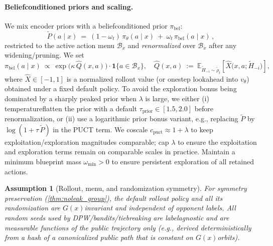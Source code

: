\documentclass[10pt]{article}
\newcommand{\E}{\mathbb{E}}
\newcommand{\1}{\mathbf{1}}
\theoremstyle{plain}
\newtheorem{assumption}{Assumption}
\begin{document}
\paragraph{Belief\textendash conditioned priors and scaling.}
We mix encoder priors with a belief\textendash conditioned prior $\pi_{\text{bel}}$:
\[
\tilde P(a\mid x)\ =\ (1-\omega_t)\,\pi_\theta(a\mid x)\ +\ \omega_t\,\pi_{\text{bel}}(a\mid x)\,,
\]
restricted to the active action menu $\mathcal{B}_x$ and \emph{renormalized} over $\mathcal{B}_x$ after any widening/pruning. We set
\[
\pi_{\text{bel}}(a\mid x)\ \propto\ \exp\!\big(\kappa\,\widehat Q(x,a)\big)\cdot \1\{a\in\mathcal{B}_x\},\quad
\widehat Q(x,a)\ :=\ \E_{\tilde H_{-i}\sim \tilde\rho_t}\!\left[\hat X\big(x,a;\tilde H_{-i}\big)\right],
\]
where $\hat X\in[-1,1]$ is a normalized rollout value (or one\textendash step lookahead into $v_\theta$) obtained under a fixed default policy. To avoid the exploration bonus being dominated by a sharply peaked prior when $\lambda$ is large, we either (i) temperature\textendash flatten the prior with a default $\tau_{\text{prior}}\in[1.5,2.0]$ before renormalization, or (ii) use a logarithmic prior bonus variant, e.g., replacing $\tilde P$ by $\log(1+\tau\,\tilde P)$ in the PUCT term. We co\textendash scale $c_{\text{puct}}\approx 1+\lambda$ to keep exploitation/exploration magnitudes comparable; cap $\lambda$ to ensure the exploitation and exploration terms remain on comparable scales in practice. Maintain a minimum blueprint mass $\omega_{\min}>0$ to ensure persistent exploration of all retained actions.

\begin{assumption}[Rollout, menu, and randomization symmetry]
\label{ass:rollout_sym}
For symmetry preservation (\cref{thm:noleak_group}), the default rollout policy and all its randomization are $G(x)$\textendash invariant and independent of opponent labels. All random seeds used by DPW/bandits/tie\textendash breaking are label\textendash agnostic and are measurable functions of the public trajectory only (e.g., derived deterministically from a hash of a \emph{canonicalized} public path that is constant on $G(x)$\textendash orbits).
\end{assumption}
\end{document}
